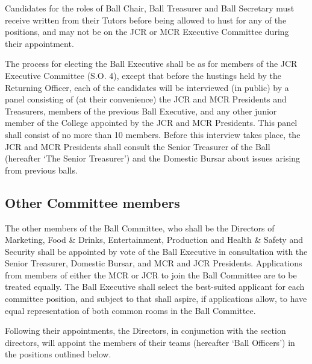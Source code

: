\appnpara Candidates for the roles of Ball Chair, Ball Treasurer and Ball Secretary must receive written from their Tutors before being allowed to hust for any of the positions, and may not be on the JCR or MCR Executive Committee during their appointment.

\appnpara The process for electing the Ball Executive shall be as for members of the JCR Executive Committee (S.O. 4), except that before the hustings held by the Returning Officer, each of the candidates will be interviewed (in public) by a panel consisting of (at their convenience) the JCR and MCR Presidents and Treasurers, members of the previous Ball Executive, and any other junior member of the College appointed by the JCR and MCR Presidents.  This panel shall consist of no more than 10 members.  Before this interview takes place, the JCR and MCR Presidents shall consult the Senior Treasurer of the Ball (hereafter ‘The Senior Treasurer’) and the Domestic Bursar about issues arising from previous balls.  

\subsection{Other Committee members}

\appnpara The other members of the Ball Committee, who shall be the Directors of Marketing, Food \& Drinks, Entertainment, Production and Health \& Safety and Security shall be appointed by vote of the Ball Executive in consultation with the Senior Treasurer, Domestic Bursar, and MCR and JCR Presidents.  Applications from members of either the MCR or JCR to join the Ball Committee are to be treated equally.  The Ball Executive shall select the best-suited applicant for each committee position, and subject to that shall aspire, if applications allow, to have equal representation of both common rooms in the Ball Committee.

\appnpara Following their appointments, the Directors, in conjunction with the section directors, will appoint the members of their teams (hereafter ‘Ball Officers’) in the positions outlined below. 

